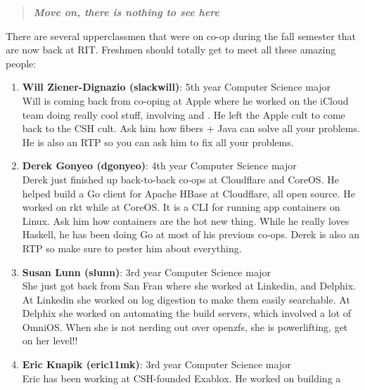 \documentclass[9pt]{extarticle}
\begin{document}
\vspace{-15px}
\begin{quote}
\centering
\textbf{\textit{Move on, there is nothing to see here}}
\end{quote}
\vspace{10px}

\vspace{-0.4cm}
\hypertarget{thirdnews}{}
There are several upperclassmen that were on co-op during the fall semester
that are now back at RIT. Freshmen should totally get to meet all these
amazing people: \\
\begin{enumerate}
\item \textbf{Will Ziener-Dignazio (slackwill)}: 5th year Computer Science major \\
	Will is coming back from co-oping at Apple where he worked on the iCloud team 
	doing really cool stuff, involving  and . He left the Apple cult to come back to the CSH cult. Ask him
	how fibers + Java can solve all your problems. He is also an RTP so you
	can ask him to fix all your problems.
\\
\item \textbf{Derek Gonyeo (dgonyeo)}: 4th year Computer Science major \\
	Derek just finished up back-to-back co-ops at Cloudflare and CoreOS. He
	helped build a Go client for Apache HBase at Cloudflare, all open source.
	He worked on rkt while at CoreOS. It is a CLI for running app containers 
	on Linux. Ask him how containers are the hot new thing. While he really
	loves Haskell, he has been doing Go at most of his previous co-ops. Derek
	is also an RTP so make sure to pester him about everything.
\\
\item \textbf{Susan Lunn (slunn)}: 3rd year Computer Science major \\
	She just got back from San Fran where she worked at Linkedin, and Delphix.
	At Linkedin she worked on log digestion to make them easily searchable. At
	Delphix she worked on automating the build servers, which involved a lot 
	of OmniOS. When she is not nerding out over openzfs, she is powerlifting,
 	get on her level!!
\\
\item \textbf{Eric Knapik (eric11mk)}: 3rd year Computer Science major \\
	Eric has been working at CSH-founded Exablox. He worked on building a 

\end{enumerate}
\end{document}
